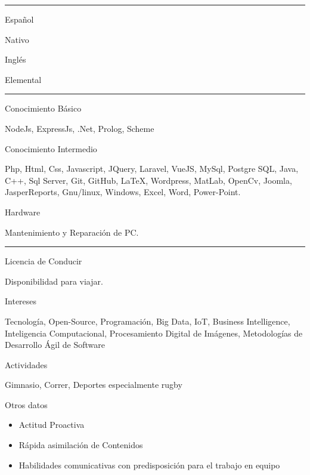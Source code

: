 \documentclass[a4paper,10pt]{article}
\newlength{\cvcolumngapwidth}
\newlength{\cvleftcolumnwidth}
\newlength{\cvrightcolumnwidth}
\newcommand{\cvsectionstyle}[1]{{\normalsize\cvsectionfont\textcolor{cvsectioncolor}{#1}}}
\newcommand{\cvheadingstyle}[1]{{\normalsize\cvheadingfont\textcolor{cvheadingcolor}{#1}}}
\newlength{\cvafteritemskipamount}
\newlength{\cvaftersectionskipamount}
\newlength{\cvbetweensectionandheadingextraskipamount}
\newlength{\cvparskip}
\newcommand{\cvsection}[1]{
    \begin{minipage}[t]{\cvleftcolumnwidth}
        \raggedleft\cvsectionstyle{#1}
    \end{minipage}%
    \hspace{\cvcolumngapwidth}%
    \begin{minipage}[t]{\cvrightcolumnwidth}
        \textcolor{cvrulecolor}{\rule{\cvrightcolumnwidth}{0.3mm}}
    \end{minipage}

    \vspace{\cvaftersectionskipamount}
}
\newcommand{\cvitem}[2]{
    \begin{minipage}[t]{\cvleftcolumnwidth}
        \raggedleft #1
    \end{minipage}%
    \hspace{\cvcolumngapwidth}%
    \begin{minipage}[t]{\cvrightcolumnwidth}
        \setlength{\parskip}{\cvparskip} #2
    \end{minipage}

    \vspace{\cvafteritemskipamount}
}
\begin{document}
\cvsection{IDIOMAS}

\vspace{\cvbetweensectionandheadingextraskipamount}

\cvitem{
    \cvheadingstyle{Español}
}{
    Nativo
}

\cvitem{
    \cvheadingstyle{Inglés}
}{
    Elemental
}

\newpage
\cvsection{HABILIDADES INFORMÁTICAS}

\cvitem{
    \cvheadingstyle{Conocimiento Básico}
}{
    NodeJs, ExpressJs, .Net, Prolog, Scheme
}

\cvitem{
    \cvheadingstyle{Conocimiento Intermedio}
}{
     Php, Html, Css, Javascript, JQuery, Laravel, VueJS, MySql, Postgre SQL, Java,  C++, Sql Server, Git, GitHub, LaTeX, Wordpress, MatLab, OpenCv, Joomla,  JasperReports, Gnu/linux, Windows,  Excel, Word, Power-Point.
}

\cvitem{
    \cvheadingstyle{Hardware}
}{
    Mantenimiento y Reparación de PC.
}


\cvsection{INFORMACIÓN ADICIONAL}

\vspace{\cvbetweensectionandheadingextraskipamount}

\cvitem{
    \cvheadingstyle{Licencia de Conducir}
}{
    Disponibilidad para viajar.
}

\cvitem{
    \cvheadingstyle{Intereses}
}{
    Tecnología, Open-Source, Programación, Big Data, IoT, Business Intelligence, Inteligencia Computacional, Procesamiento Digital de Imágenes, Metodologías de Desarrollo Ágil de Software
}

\cvitem{
    \cvheadingstyle{Actividades}
}{
    Gimnasio, Correr, Deportes especialmente rugby
}

\cvitem{
    \cvheadingstyle{Otros datos}
}{
    \begin{itemize}
        \item Actitud Proactiva
        \item Rápida asimilación de Contenidos
        \item Habilidades comunicativas con predisposición para el trabajo en equipo
    \end{itemize}
}
\end{document}
